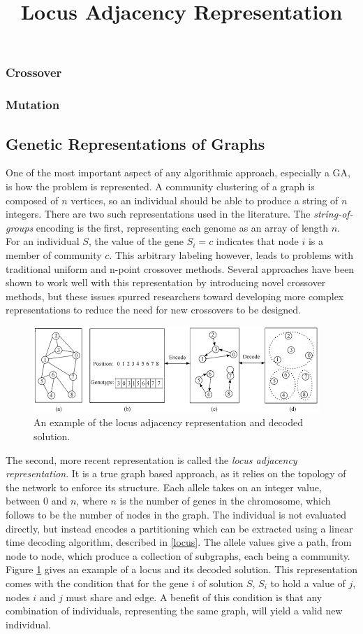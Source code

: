 \subsubsection{Crossover}


\subsubsection{Mutation}


\subsection{Genetic Representations of Graphs}
One of the most important aspect of any algorithmic approach, especially a GA, is how the problem is represented. A community clustering of a graph is composed of $n$ vertices, so an individual should be able to produce a string of $n$ integers. There are two such representations used in the literature. The \textit{string-of-groups} encoding is the first, representing each genome as an array of length $n$. For an individual $S$, the value of the gene $S_i=c$ indicates that node $i$ is a member of community $c$. This arbitrary labeling however, leads to problems with traditional uniform and n-point crossover methods. Several approaches have been shown to work well with this representation by introducing novel crossover methods\cite{Tasgin2006}, but these issues spurred researchers toward developing more complex representations to reduce the need for new crossovers to be designed.
\begin{figure}[!htb]
	\title{Locus Adjacency Representation}
	\begin{center}
		\includegraphics[scale=1.]{images/locus_img.png}
	\end{center}
	\caption{An example of the locus adjacency representation and decoded solution.}
	\label{locus_img}
\end{figure}
The second, more recent representation is called the \textit{locus adjacency representation}. It is a true graph based approach, as it relies on the topology of the network to enforce its structure. Each allele takes on an integer value, between 0 and $n$, where $n$ is the number of genes in the chromosome, which follows to be the number of nodes in the graph. The individual is not evaluated directly, but instead encodes a partitioning which can be extracted using a linear time decoding algorithm, described in \ref{locus}. The allele values give a path, from node to node, which produce a collection of subgraphs, each being a community. Figure \ref{locus_img} gives an example of a locus and its decoded solution. This representation comes with the condition that for the gene $i$ of solution $S$, $S_i$ to hold a value of $j$, nodes $i$ and $j$ must share and edge. A benefit of this condition is that any combination of individuals, representing the same graph, will yield a valid new individual.

